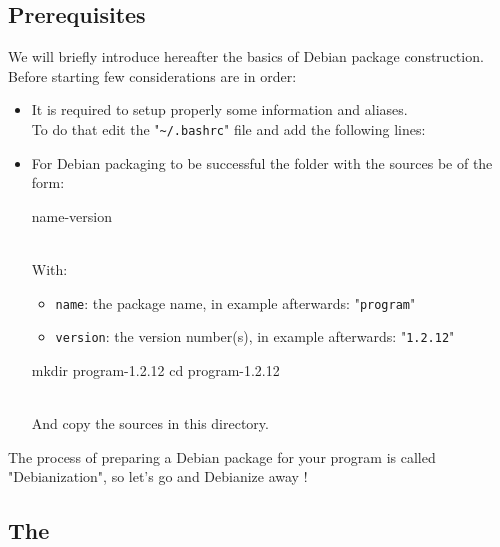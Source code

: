 \newpage
\subsection{Prerequisites}
\label{dprereq}
We will briefly introduce hereafter the basics of Debian package construction. \\
Before starting few considerations are in order:
\begin{itemize}
\item It is required to setup properly some information and aliases.\\
To do that edit the "\texttt{\textasciitilde/.bashrc}" file and add the following lines:
\begin{scripti}
 \bad{=}\reg{\email}
 \bad{=}

 \bad{=}
\end{scripti}
\item For Debian packaging to be successful the folder with the sources  be of the form: 
\begin{scripti}name-version\end{scripti}
\\[-0.75cm]
With: 
\begin{itemize}
\item \texttt{name}: the package name, in example afterwards: "\texttt{program}"
\item \texttt{version}: the version number(s), in example afterwards: "\texttt{1.2.12}"
\end{itemize}
\vspace{-1cm}
\begin{scripti}
\uprompt{~} mkdir program-1.2.12
\uprompt{~} cd program-1.2.12
\end{scripti}
\\[-0.75cm]
\noindent And copy the sources in this directory. 
\end{itemize}
The process of preparing a Debian package for your program is called "Debianization", 
so let's go and Debianize away !

\newpage
\subsection{The \ddir}

